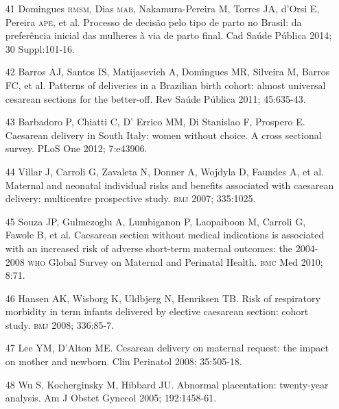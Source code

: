 \documentclass{article}
\begin{document}
\begin{itemize}
\item[41] Domingues \textsc{rmsm}, Dias \textsc{mab}, Nakamura-Pereira M, Torres JA, d’Orsi E,
Pereira \textsc{ape}, et al. Processo de decisão pelo tipo de parto no Brasil: da
preferência inicial das mulheres à via de parto final. Cad Saúde Pública 2014;
30 Suppl:101-16.

\item[42] Barros AJ, Santos IS, Matijasevich A, Domingues MR, Silveira M,
Barros FC, et al. Patterns of deliveries in a Brazilian birth cohort: almost
universal cesarean sections for the better-off. Rev Saúde Pública 2011;
45:635-43.

\item[43] Barbadoro P, Chiatti C, D’ Errico MM, Di Stanislao F, Prospero E.
Caesarean delivery in South Italy: women without choice. A cross sectional
survey. PLoS One 2012; 7:e43906.

\item[44] Villar J, Carroli G, Zavaleta N, Donner A, Wojdyla D, Faundes A, et
al. Maternal and neonatal individual risks and benefits associated with
caesarean delivery: multicentre prospective study. \textsc{bmj} 2007;
335:1025.

\item[45] Souza JP, Gulmezoglu A, Lumbiganon P, Laopaiboon M, Carroli G,
Fawole B, et al. Caesarean section without medical indications is associated
with an increased risk of adverse short-term maternal outcomes: the 2004-2008
\textsc{who} Global Survey on Maternal and Perinatal Health. \textsc{bmc} Med 2010;
8:71.

\item[46] Hansen AK, Wisborg K, Uldbjerg N, Henriksen TB. Risk of respiratory
morbidity in term infants delivered by elective caesarean section: cohort study.
\textsc{bmj} 2008; 336:85-7.

\item[47] Lee YM, D’Alton ME. Cesarean delivery on maternal request: the
impact on mother and newborn. Clin Perinatol 2008; 35:505-18.

\item[48] Wu S, Kocherginsky M, Hibbard JU. Abnormal placentation:
twenty-year analysis. Am J Obstet Gynecol 2005; 192:1458-61.

\end{itemize}
\end{document}
